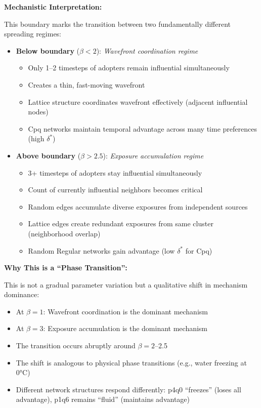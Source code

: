\documentclass[12pt,a4paper]{article}
\begin{document}
\textbf{Mechanistic Interpretation:}

This boundary marks the transition between two fundamentally different spreading regimes:

\begin{itemize}
    \item \textbf{Below boundary} ($\beta < 2$): \textit{Wavefront coordination regime}
    \begin{itemize}
        \item Only 1--2 timesteps of adopters remain influential simultaneously
        \item Creates a thin, fast-moving wavefront
        \item Lattice structure coordinates wavefront effectively (adjacent influential nodes)
        \item Cpq networks maintain temporal advantage across many time preferences (high $\delta^*$)
    \end{itemize}

    \item \textbf{Above boundary} ($\beta > 2.5$): \textit{Exposure accumulation regime}
    \begin{itemize}
        \item 3+ timesteps of adopters stay influential simultaneously
        \item Count of currently influential neighbors becomes critical
        \item Random edges accumulate diverse exposures from independent sources
        \item Lattice edges create redundant exposures from same cluster (neighborhood overlap)
        \item Random Regular networks gain advantage (low $\delta^*$ for Cpq)
    \end{itemize}
\end{itemize}

\textbf{Why This is a ``Phase Transition'':}

This is not a gradual parameter variation but a qualitative shift in mechanism dominance:
\begin{itemize}
    \item At $\beta=1$: Wavefront coordination is the dominant mechanism
    \item At $\beta=3$: Exposure accumulation is the dominant mechanism
    \item The transition occurs abruptly around $\beta=2$--2.5
    \item The shift is analogous to physical phase transitions (e.g., water freezing at 0°C)
    \item Different network structures respond differently: p4q0 ``freezes'' (loses all advantage), p1q6 remains ``fluid'' (maintains advantage)
\end{itemize}
\end{document}
